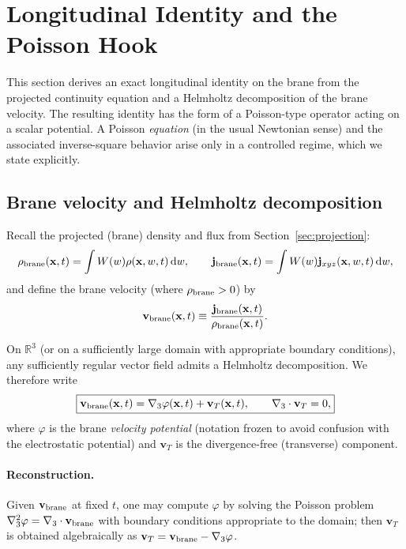 \documentclass[11pt]{article}
\begin{document}
\section{Longitudinal Identity and the Poisson Hook}
\label{sec:poisson}

This section derives an exact longitudinal identity on the brane from the projected continuity equation and a Helmholtz decomposition of the brane velocity. The resulting identity has the form of a Poisson-type operator acting on a scalar potential. A Poisson \emph{equation} (in the usual Newtonian sense) and the associated inverse-square behavior arise only in a controlled regime, which we state explicitly.

\subsection{Brane velocity and Helmholtz decomposition}
\label{sec:poisson-helmholtz}

Recall the projected (brane) density and flux from Section~\ref{sec:projection}:
\begin{equation}
\rho_{\rm brane}(\mathbf{x},t)=\int W(w)\rho(\mathbf{x},w,t)\,\dd w,
\qquad
\mathbf{j}_{\rm brane}(\mathbf{x},t)=\int W(w)\mathbf{j}_{xyz}(\mathbf{x},w,t)\,\dd w,
\end{equation}
and define the brane velocity (where $\rho_{\rm brane}>0$) by
\begin{equation}
\mathbf{v}_{\rm brane}(\mathbf{x},t) \equiv \frac{\mathbf{j}_{\rm brane}(\mathbf{x},t)}{\rho_{\rm brane}(\mathbf{x},t)}.
\label{eq:vbrane-again}
\end{equation}

On $\mathbb{R}^3$ (or on a sufficiently large domain with appropriate boundary conditions), any sufficiently regular vector field admits a Helmholtz decomposition. We therefore write
\begin{equation}
\boxed{
\mathbf{v}_{\rm brane}(\mathbf{x},t) = \nabla_3 \varphi(\mathbf{x},t) + \mathbf{v}_T(\mathbf{x},t),
\qquad
\nabla_3\cdot \mathbf{v}_T = 0,
}
\label{eq:helmholtz}
\end{equation}
where $\varphi$ is the brane \emph{velocity potential} (notation frozen to avoid confusion with the electrostatic potential) and $\mathbf{v}_T$ is the divergence-free (transverse) component.
\paragraph{Reconstruction.} Given $\mathbf v_{\rm brane}$ at fixed $t$, one may compute $\varphi$ by solving the Poisson problem $\nabla_3^2\varphi=\nabla_3\cdot\mathbf v_{\rm brane}$ with boundary conditions appropriate to the domain; then $\mathbf v_T$ is obtained algebraically as $\mathbf v_T=\mathbf v_{\rm brane}-\nabla_3\varphi$.
\end{document}
